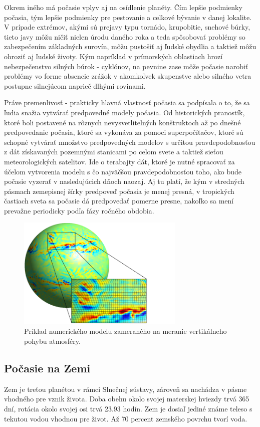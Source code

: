 Okrem iného má počasie vplyv aj na osídlenie planéty. Čím lepšie podmienky počasia, tým lepšie podmienky pre pestovanie a celkové bývanie v danej lokalite. V prípade extrémov, akými sú prejavy typu tornádo, krupobitie, snehové búrky, tieto javy môžu ničiť nielen úrodu daného roka a teda spôsobovať problémy so zabezpečením základných surovín, môžu pustošiť aj ľudské obydlia a taktiež môžu ohroziť aj ľudské životy. Kým napríklad v prímorských oblastiach hrozí nebezpečenstvo silných búrok - cyklónov, na pevnine zase môže počasie narobiť problémy vo forme absencie zrážok v akomkoľvek skupenstve alebo silného vetra postupne silnejúcom naprieč dlhými rovinami.

Práve premenlivosť - prakticky hlavná vlastnosť počasia sa podpísala o to, že sa ľudia snažia vytvárať predpovedné modely počasia. Od historických pranostík, ktoré boli postavené na rôznych nevysvetlitelných konštruktoch až po dnešné predpovedanie počasia, ktoré sa vykonáva za pomoci superpočítačov, ktoré sú schopné vytvárať množstvo predpovedných modelov s určitou pravdepodobnosťou z dát získavaných pozemnými stanicami po celom svete a taktiež sieťou meteorologických satelitov. Ide o terabajty dát, ktoré je nutné spracovať za účelom vytvorenia modelu s čo najväčšou pravdepodobnosťou toho, ako bude počasie vyzerať v nasledujúcich dňoch naozaj. Aj tu platí, že kým v stredných pásmach zemepisnej šírky predpoveď počasia je menej presná, v tropických častiach sveta sa počasie dá predpovedať pomerne presne, nakoľko sa mení prevažne periodicky podľa fázy ročného obdobia.

\begin{figure}[!htbp]
  \centering
  \includegraphics[width=8cm]{img/numerical_prediction_model.png}
  \caption{Príklad numerického modelu zameraného na meranie vertikálneho pohybu atmosféry.}
  \label{numModel}
\end{figure}

\subsection{Počasie na Zemi}
Zem je treťou planétou v rámci Slnečnej sústavy, zároveň sa nachádza v pásme vhodného pre vznik života. Doba obehu okolo svojej materskej hviezdy trvá 365 dní, rotácia okolo svojej osi trvá 23.93 hodín. Zem je dosiaľ jediné známe teleso s tekutou vodou vhodnou pre život. Až 70 percent zemského povrchu tvorí voda.

